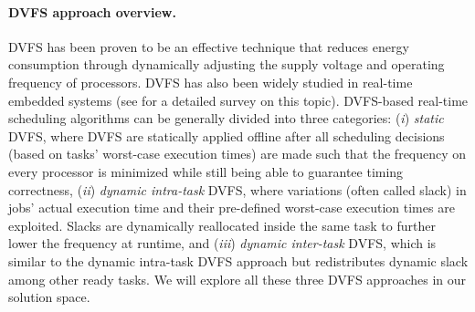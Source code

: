
\paragraph{DVFS approach overview.} DVFS has been proven to be an effective technique that reduces energy consumption through dynamically adjusting the supply voltage and operating frequency of processors. DVFS has also been widely studied in real-time embedded systems (see \cite{bhatti2011energy} for a detailed survey on this topic). DVFS-based real-time scheduling algorithms can be generally divided into three categories: (\textit{i}) \textit{static} DVFS, where DVFS are statically applied offline after all scheduling decisions (based on tasks' worst-case execution times) are made such that the frequency on every processor is minimized while still being able to guarantee timing correctness, (\textit{ii}) \textit{dynamic intra-task} DVFS, where variations (often called slack) in jobs' actual execution time and their pre-defined worst-case execution times are exploited. Slacks are dynamically reallocated inside the same task to further lower the frequency at runtime, and (\textit{iii}) \textit{dynamic inter-task} DVFS, which is similar to the dynamic intra-task DVFS approach but redistributes dynamic slack among other ready tasks. We will explore all these three DVFS approaches in our solution space.



